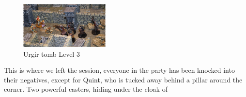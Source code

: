 \begin{figure}[h]
	\centering
	\includegraphics[width=0.4\textwidth]{images/Urgir-tomb-Level-3-594713616_mod.jpg}
	\caption{Urgir tomb Level 3}
	\label{fig:Urgir-tomb-Level-3-594713616}
\end{figure}

This is where we left the session, everyone in the party has been knocked into their negatives, except for Quint, who is tucked away behind a pillar around the corner. Two powerful casters, hiding under the cloak of 